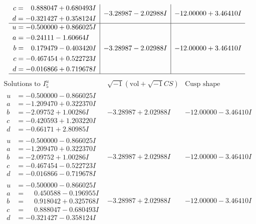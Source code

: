 \documentclass[1p]{elsarticle_modified}
\theoremstyle{definition}
\newcommand{\I}{\sqrt{-1}}
\begin{document}
$$\begin{array}{c|c|c}
\begin{aligned}
c &= \phantom{-}0.888047 + 0.680493 I \\
d &= -0.321427 + 0.358124 I\end{aligned}
 & -3.28987 - 2.02988 I & -12.00000 + 3.46410 I \\ \hline\begin{aligned}
u &= -0.500000 + 0.866025 I \\
a &= -0.24111 - 1.60664 I \\
b &= \phantom{-}0.179479 - 0.403420 I \\
c &= -0.467454 + 0.522723 I \\
d &= -0.016866 + 0.719678 I\end{aligned}
 & -3.28987 - 2.02988 I & -12.00000 + 3.46410 I\\
 \hline 
 \end{array}$$\newpage$$\begin{array}{c|c|c}  
\text{Solutions to }I^u_{5}& \I (\text{vol} + \sqrt{-1}CS) & \text{Cusp shape}\\
 \hline 
\begin{aligned}
u &= -0.500000 - 0.866025 I \\
a &= -1.209470 + 0.322370 I \\
b &= -2.09752 + 1.00286 I \\
c &= -0.420593 + 1.203220 I \\
d &= -0.66171 + 2.80985 I\end{aligned}
 & -3.28987 + 2.02988 I & -12.00000 - 3.46410 I \\ \hline\begin{aligned}
u &= -0.500000 - 0.866025 I \\
a &= -1.209470 + 0.322370 I \\
b &= -2.09752 + 1.00286 I \\
c &= -0.467454 - 0.522723 I \\
d &= -0.016866 - 0.719678 I\end{aligned}
 & -3.28987 + 2.02988 I & -12.00000 - 3.46410 I \\ \hline\begin{aligned}
u &= -0.500000 - 0.866025 I \\
a &= \phantom{-}0.450588 - 0.196955 I \\
b &= \phantom{-}0.918042 + 0.325768 I \\
c &= \phantom{-}0.888047 - 0.680493 I \\
d &= -0.321427 - 0.358124 I\end{aligned}
 & -3.28987 + 2.02988 I & -12.00000 - 3.46410 I \\ \hline\begin{aligned}

\end{aligned}
\end{array}$$
\end{document}
